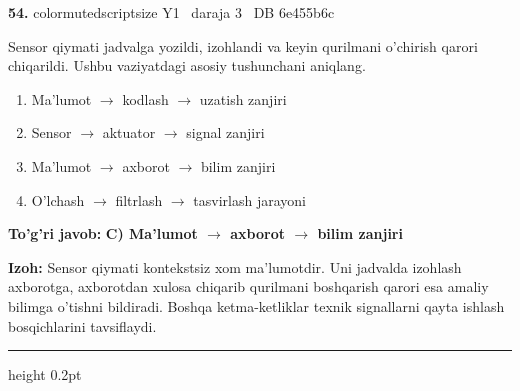 \documentclass[10pt,a4paper,oneside]{article}
\begin{document}
\noindent\textbf{\color{ink}54.}  {color{muted}scriptsize Y1 \textbullet\ daraja 3 \textbullet\ DB 6e455b6c}
\par
Sensor qiymati jadvalga yozildi, izohlandi va keyin qurilmani o'chirish qarori chiqarildi. Ushbu vaziyatdagi asosiy tushunchani aniqlang.
\begin{enumerate}[label=\Alph*),leftmargin=9mm]
\item Ma'lumot \ensuremath{\to} kodlash \ensuremath{\to} uzatish zanjiri
\item Sensor \ensuremath{\to} aktuator \ensuremath{\to} signal zanjiri
\item Ma'lumot \ensuremath{\to} axborot \ensuremath{\to} bilim zanjiri
\item O'lchash \ensuremath{\to} filtrlash \ensuremath{\to} tasvirlash jarayoni
\end{enumerate}
\begin{tcolorbox}[enhanced,breakable,colback=teal!4,colframe=teal!50!black,boxrule=0.5pt,arc=1.1mm,left=3mm,right=3mm,top=1.7mm,bottom=1.7mm,before skip=2mm,after skip=2mm]
\textbf{\color{teal}To'g'ri javob:} \textbf{C) Ma'lumot \ensuremath{\to} axborot \ensuremath{\to} bilim zanjiri}
\par\smallskip
\textbf{Izoh:} Sensor qiymati kontekstsiz xom ma'lumotdir. Uni jadvalda izohlash axborotga, axborotdan xulosa chiqarib qurilmani boshqarish qarori esa amaliy bilimga o'tishni bildiradi. Boshqa ketma-ketliklar texnik signallarni qayta ishlash bosqichlarini tavsiflaydi.
\end{tcolorbox}
\vspace{2mm}\hrule height 0.2pt \vspace{3mm}
\end{document}
